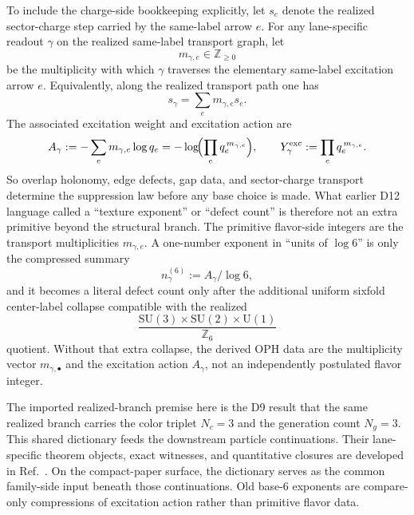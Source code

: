 \documentclass[11pt]{article}
\newcommand{\SU}{\mathrm{SU}}
\newcommand{\U}{\mathrm{U}}
\begin{document}
To include the charge-side bookkeeping explicitly, let \(s_e\) denote the realized sector-charge step carried by the same-label arrow \(e\). For any lane-specific readout \(\gamma\) on the realized same-label transport graph, let
\[
m_{\gamma,e}\in\mathbb Z_{\ge 0}
\]
be the multiplicity with which \(\gamma\) traverses the elementary same-label excitation arrow \(e\). Equivalently, along the realized transport path one has
\[
s_\gamma=\sum_e m_{\gamma,e}s_e.
\]
The associated excitation weight and excitation action are
\[
A_\gamma
:=
-\sum_e m_{\gamma,e}\log q_e
=
-\log\!\Bigl(\prod_e q_e^{\,m_{\gamma,e}}\Bigr),
\qquad
Y_\gamma^{\mathrm{exc}}
:=
\prod_e q_e^{\,m_{\gamma,e}}.
\]
So overlap holonomy, edge defects, gap data, and sector-charge transport determine the suppression law before any base choice is made. What earlier D12 language called a ``texture exponent'' or ``defect count'' is therefore not an extra primitive beyond the structural branch. The primitive flavor-side integers are the transport multiplicities \(m_{\gamma,e}\). A one-number exponent in ``units of \(\log 6\)'' is only the compressed summary
\[
n_\gamma^{(6)}:=A_\gamma/\log 6,
\]
and it becomes a literal defect count only after the additional uniform sixfold center-label collapse compatible with the realized
\[
\frac{\SU(3)\times\SU(2)\times\U(1)}{\mathbb Z_6}
\]
quotient. Without that extra collapse, the derived OPH data are the multiplicity vector \(m_{\gamma,\bullet}\) and the excitation action \(A_\gamma\), not an independently postulated flavor integer.

The imported realized-branch premise here is the D9 result that the same realized branch carries the color triplet \(N_c=3\) and the generation count \(N_g=3\).
This shared dictionary feeds the downstream particle continuations. Their lane-specific theorem
objects, exact witnesses, and quantitative closures are developed in
Ref.~\cite{ophparticles}. On the compact-paper surface, the dictionary serves as the common
family-side input beneath those continuations. Old base-6 exponents are compare-only
compressions of excitation action rather than primitive flavor data.
\end{document}

